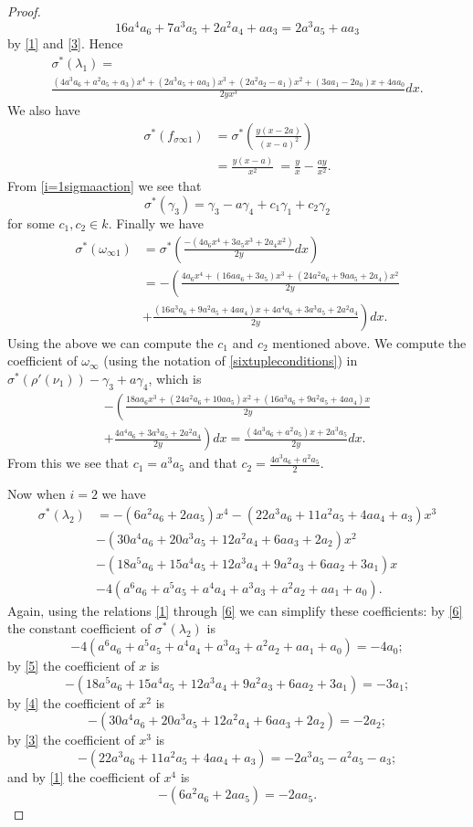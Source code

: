 \documentclass[draft, 11pt]{article} %
\theoremstyle{plain}
\theoremstyle{remark}
\begin{document}
\begin{proof}
\[
16a^4a_6+7a^3a_5+2a^2a_4+aa_3 = 2a^3a_5 +aa_3
\]
by \ref{1} and \ref{3}.
Hence
\begin{multline*}
\sigma^*(\lambda_1) = \\ \frac{(4a^3a_6+a^2a_5+a_3)x^4+(2a^3a_5+aa_3)x^3+(2a^2a_2-a_1)x^2+(3aa_1-2a_0)x+4aa_0}{2yx^3}dx.
\end{multline*}
We also have
\begin{align}\label{i=1sigmaaction}
\sigma^*(f_{\sigma \infty 1}) & = \sigma^*\left(\frac{y(x-2a)}{(x-a)^2} \right) \nonumber\\
& = \frac{y(x-a)}{x^2}  \
 = \frac{y}{x} - \frac{ay}{x^2}.
\end{align}
From \eqref{i=1sigmaaction} we see that
\begin{equation}\label{firstidentity}
\sigma^*(\gamma_3) = \gamma_3 - a\gamma_4 + c_1\gamma_1 + c_2 \gamma_2
\end{equation}
for some $c_1,c_2 \in k$.
Finally we have
\begin{align*}
\sigma^* (\omega_{\infty 1}) & = \sigma^*\left( \frac{-(4a_6x^4+3a_5x^3+2a_4x^2)}{2y} dx \right) \\
& = - \left( \frac{4a_6x^4+(16aa_6+3a_5)x^3+(24a^2a_6+9aa_5+2a_4)x^2}{2y}\right. \\ 
& \left. +\frac{(16a^3a_6+9a^2a_5+4aa_4)x+4a^4a_6+3a^3a_5+2a^2a_4}{2y}\right) dx.
\end{align*}
Using the above we can compute the $c_1$ and $c_2$ mentioned above.
We compute the coefficient of $\omega_{\infty}$ (using the notation of \eqref{sixtupleconditions}) in $\sigma^*(\rho'(\nu_1)) - \gamma_3 + a\gamma_4$, which is
\begin{multline*}
 -\left( \frac{18aa_6x^3 +(24a^2a_6+10aa_5)x^2+(16a^3a_6+9a^2a_5+4aa_4)x}{2y} \right. \\
+ \left. \frac{4a^4a_6+3a^3a_5+2a^2a_4}{2y}\right) dx  = \frac{(4a^3a_6+a^2a_5)x +2a^3a_5}{2y}dx.
\end{multline*}
From this we see that $c_1= a^3a_5$ and that $c_2 = \frac{4a^3a_6+a^2a_5}{2}$.


Now when $i=2$ we have
\begin{align*}
\sigma^*(\lambda_2) & = -(6a^2a_6+2aa_5)x^4 - (22a^3a_6+11a^2a_5+4aa_4+a_3)x^3 \\
& - (30a^4a_6+20a^3a_5+12a^2a_4+6aa_3+2a_2)x^2 \\
& - (18a^5a_6+15a^4a_5+12a^3a_4+9a^2a_3+6aa_2+3a_1)x \\
& -4(a^6a_6+a^5a_5+a^4a_4+a^3a_3+a^2a_2+aa_1+a_0).
\end{align*}
Again, using the relations \ref{1} through \ref{6} we can simplify these coefficients:
by \ref{6} the constant coefficient of $\sigma^*(\lambda_2)$ is
\[
-4(a^6a_6+a^5a_5+a^4a_4+a^3a_3+a^2a_2+aa_1+a_0) = -4a_0;
\]
by \ref{5} the coefficient of $x$ is
\[
- (18a^5a_6+15a^4a_5+12a^3a_4+9a^2a_3+6aa_2+3a_1) = -3a_1;
\]
by \ref{4} the coefficient of $x^2$ is 
\[
- (30a^4a_6+20a^3a_5+12a^2a_4+6aa_3+2a_2) = -2a_2;
\]
by \ref{3} the coefficient of $x^3$ is
\[
- (22a^3a_6+11a^2a_5+4aa_4+a_3) = -2a^3a_5-a^2a_5-a_3;
\]
and by \ref{1} the coefficient of $x^4$ is
\[
-(6a^2a_6+2aa_5) = -2aa_5.
\]


\end{proof}
\end{document}
